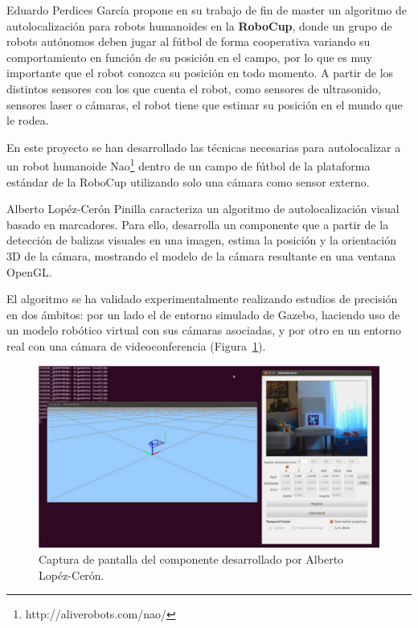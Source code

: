 Eduardo Perdices García \parencite{ref3} propone en su trabajo de fin de master un algoritmo de autolocalización para robots humanoides en la \textbf{RoboCup}, donde un grupo de robots autónomos deben jugar al fútbol de forma cooperativa variando su comportamiento en función de su posición en el campo, por lo que es muy importante que el robot conozca su posición en todo momento. A partir de los distintos sensores con los que cuenta el robot, como sensores de ultrasonido, sensores laser o cámaras, el robot tiene que estimar su posición en el mundo que le rodea.

En este proyecto se han desarrollado las técnicas necesarias para autolocalizar a un robot humanoide Nao\footnote{http://aliverobots.com/nao/} dentro de un campo de fútbol de la plataforma estándar de la RoboCup utilizando solo una cámara como sensor externo.

Alberto Lopéz-Cerón Pinilla \parencite{ref2} caracteriza un algoritmo de autolocalización visual basado en marcadores. Para ello, desarrolla un componente que a partir de la detección de balizas visuales en una imagen, estima la posición y la orientación 3D de la cámara, mostrando el modelo de la cámara resultante en una ventana OpenGL.

El algoritmo se ha validado experimentalmente realizando estudios de precisión en dos ámbitos: por un lado el de entorno simulado de Gazebo, haciendo uso de un modelo robótico virtual con sus cámaras asociadas, y por otro en un entorno real con una cámara de videoconferencia (Figura~\ref{fig:ceron}).

\begin{figure}[th]
\centering
\includegraphics[scale=0.35]{Figures/cap-ceron.png}
\decoRule
\caption[Captura de pantalla, TFM de Alberto Lopéz-Cerón]{Captura de pantalla del componente desarrollado por Alberto Lopéz-Cerón.}
\label{fig:ceron}
\end{figure}

